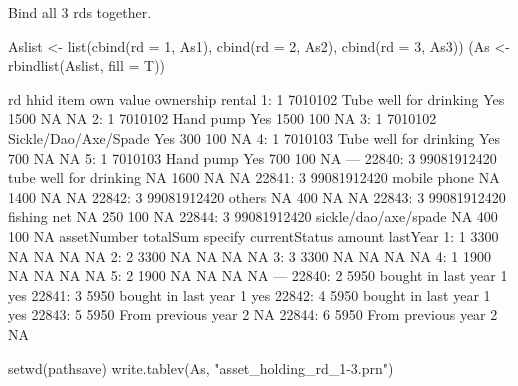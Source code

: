 Bind all 3 rds together.
\begin{Schunk}
\begin{Sinput}
Aslist <- list(cbind(rd = 1, As1), cbind(rd = 2, As2), cbind(rd = 3, As3))
(As <- rbindlist(Aslist, fill = T))
\end{Sinput}
\begin{Soutput}
       rd        hhid                   item own value ownership rental
    1:  1     7010102 Tube well for drinking Yes  1500        NA     NA
    2:  1     7010102              Hand pump Yes  1500       100     NA
    3:  1     7010102   Sickle/Dao/Axe/Spade Yes   300       100     NA
    4:  1     7010103 Tube well for drinking Yes   700        NA     NA
    5:  1     7010103              Hand pump Yes   700       100     NA
   ---                                                                 
22840:  3 99081912420 tube well for drinking  NA  1600        NA     NA
22841:  3 99081912420           mobile phone  NA  1400        NA     NA
22842:  3 99081912420                 others  NA   400        NA     NA
22843:  3 99081912420            fishing net  NA   250       100     NA
22844:  3 99081912420   sickle/dao/axe/spade  NA   400       100     NA
       assetNumber totalSum specify       currentStatus amount lastYear
    1:           1     3300      NA                  NA     NA       NA
    2:           2     3300      NA                  NA     NA       NA
    3:           3     3300      NA                  NA     NA       NA
    4:           1     1900      NA                  NA     NA       NA
    5:           2     1900      NA                  NA     NA       NA
   ---                                                                 
22840:           2     5950         bought in last year      1      yes
22841:           3     5950         bought in last year      1      yes
22842:           4     5950         bought in last year      1      yes
22843:           5     5950          From previous year      2       NA
22844:           6     5950          From previous year      2       NA
\end{Soutput}
\begin{Sinput}
setwd(pathsave)
write.tablev(As, "asset_holding_rd_1-3.prn")
\end{Sinput}
\end{Schunk}
